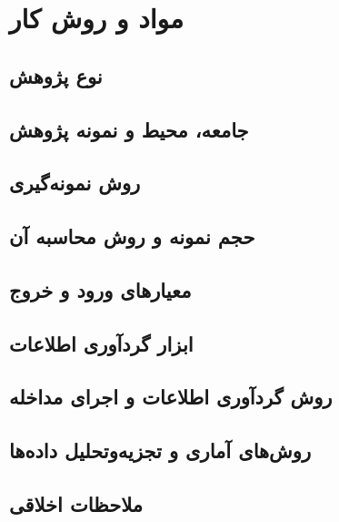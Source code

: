 \ChapterStart
\chapter{مواد و روش کار}
\label{ch:methods}

\section{نوع پژوهش}
\label{sec:study-design}

\section{جامعه، محیط و نمونه پژوهش}
\label{sec:population}


\section{روش نمونه‌گیری}
\label{sec:sampling}



\section{حجم نمونه و روش محاسبه آن}
\label{sec:sample-size}




\section{معیارهای ورود و خروج}
\label{sec:eligibility}



\section{ابزار گردآوری اطلاعات}
\label{sec:instruments}




\section{روش گردآوری اطلاعات و اجرای مداخله}
\label{sec:procedure}



\section{روش‌های آماری و تجزیه‌وتحلیل داده‌ها}
\label{sec:statistics}



\section{ملاحظات اخلاقی}
\label{sec:ethics}